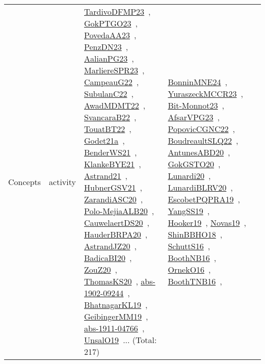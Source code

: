 {\begin{longtable}{lp{3cm}>{\raggedright\arraybackslash}p{6cm}>{\raggedright\arraybackslash}p{6cm}>{\raggedright\arraybackslash}p{8cm}}
\index{activity}\index{Concepts!activity}Concepts & activity & \href{../works/TardivoDFMP23.pdf}{TardivoDFMP23}~\cite{TardivoDFMP23}, \href{../works/GokPTGO23.pdf}{GokPTGO23}~\cite{GokPTGO23}, \href{../works/PovedaAA23.pdf}{PovedaAA23}~\cite{PovedaAA23}, \href{../works/PenzDN23.pdf}{PenzDN23}~\cite{PenzDN23}, \href{../works/AalianPG23.pdf}{AalianPG23}~\cite{AalianPG23}, \href{../works/MarliereSPR23.pdf}{MarliereSPR23}~\cite{MarliereSPR23}, \href{../works/CampeauG22.pdf}{CampeauG22}~\cite{CampeauG22}, \href{../works/SubulanC22.pdf}{SubulanC22}~\cite{SubulanC22}, \href{../works/AwadMDMT22.pdf}{AwadMDMT22}~\cite{AwadMDMT22}, \href{../works/SvancaraB22.pdf}{SvancaraB22}~\cite{SvancaraB22}, \href{../works/TouatBT22.pdf}{TouatBT22}~\cite{TouatBT22}, \href{../works/Godet21a.pdf}{Godet21a}~\cite{Godet21a}, \href{../works/BenderWS21.pdf}{BenderWS21}~\cite{BenderWS21}, \href{../works/KlankeBYE21.pdf}{KlankeBYE21}~\cite{KlankeBYE21}, \href{../works/Astrand21.pdf}{Astrand21}~\cite{Astrand21}, \href{../works/HubnerGSV21.pdf}{HubnerGSV21}~\cite{HubnerGSV21}, \href{../works/ZarandiASC20.pdf}{ZarandiASC20}~\cite{ZarandiASC20}, \href{../works/Polo-MejiaALB20.pdf}{Polo-MejiaALB20}~\cite{Polo-MejiaALB20}, \href{../works/CauwelaertDS20.pdf}{CauwelaertDS20}~\cite{CauwelaertDS20}, \href{../works/HauderBRPA20.pdf}{HauderBRPA20}~\cite{HauderBRPA20}, \href{../works/AstrandJZ20.pdf}{AstrandJZ20}~\cite{AstrandJZ20}, \href{../works/BadicaBI20.pdf}{BadicaBI20}~\cite{BadicaBI20}, \href{../works/ZouZ20.pdf}{ZouZ20}~\cite{ZouZ20}, \href{../works/ThomasKS20.pdf}{ThomasKS20}~\cite{ThomasKS20}, \href{../works/abs-1902-09244.pdf}{abs-1902-09244}~\cite{abs-1902-09244}, \href{../works/BhatnagarKL19.pdf}{BhatnagarKL19}~\cite{BhatnagarKL19}, \href{../works/GeibingerMM19.pdf}{GeibingerMM19}~\cite{GeibingerMM19}, \href{../works/abs-1911-04766.pdf}{abs-1911-04766}~\cite{abs-1911-04766}, \href{../works/UnsalO19.pdf}{UnsalO19}~\cite{UnsalO19}... (Total: 217) & \href{../works/BonninMNE24.pdf}{BonninMNE24}~\cite{BonninMNE24}, \href{../works/YuraszeckMCCR23.pdf}{YuraszeckMCCR23}~\cite{YuraszeckMCCR23}, \href{../works/Bit-Monnot23.pdf}{Bit-Monnot23}~\cite{Bit-Monnot23}, \href{../works/AfsarVPG23.pdf}{AfsarVPG23}~\cite{AfsarVPG23}, \href{../works/PopovicCGNC22.pdf}{PopovicCGNC22}~\cite{PopovicCGNC22}, \href{../works/BoudreaultSLQ22.pdf}{BoudreaultSLQ22}~\cite{BoudreaultSLQ22}, \href{../works/AntunesABD20.pdf}{AntunesABD20}~\cite{AntunesABD20}, \href{../works/GokGSTO20.pdf}{GokGSTO20}~\cite{GokGSTO20}, \href{../works/Lunardi20.pdf}{Lunardi20}~\cite{Lunardi20}, \href{../works/LunardiBLRV20.pdf}{LunardiBLRV20}~\cite{LunardiBLRV20}, \href{../works/EscobetPQPRA19.pdf}{EscobetPQPRA19}~\cite{EscobetPQPRA19}, \href{../works/YangSS19.pdf}{YangSS19}~\cite{YangSS19}, \href{../works/Hooker19.pdf}{Hooker19}~\cite{Hooker19}, \href{../works/Novas19.pdf}{Novas19}~\cite{Novas19}, \href{../works/ShinBBHO18.pdf}{ShinBBHO18}~\cite{ShinBBHO18}, \href{../works/SchuttS16.pdf}{SchuttS16}~\cite{SchuttS16}, \href{../works/BoothNB16.pdf}{BoothNB16}~\cite{BoothNB16}, \href{../works/OrnekO16.pdf}{OrnekO16}~\cite{OrnekO16}, \href{../works/BoothTNB16.pdf}{BoothTNB16}~\cite{BoothTNB16}, 
\end{longtable}}

